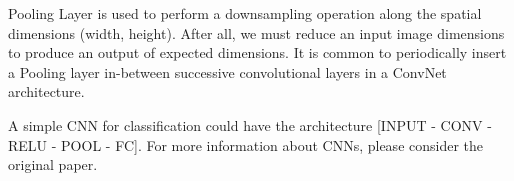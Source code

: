 Pooling Layer is used to perform a downsampling operation along the spatial dimensions (width, height). After all, we must reduce an input image dimensions to produce an output of expected dimensions.  It is common to periodically insert a Pooling layer in-between successive convolutional layers in a ConvNet architecture.

A simple CNN for classification could have the architecture [INPUT - CONV - RELU - POOL - FC]. For more information about CNNs, please consider the original paper\cite{krizhevsky2012imagenet}. 
